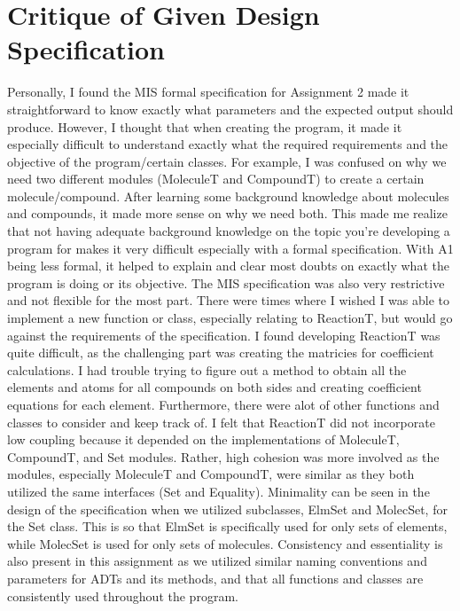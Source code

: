 \documentclass[12pt]{article}
\begin{document}
\section{Critique of Given Design Specification}
Personally, I found the MIS formal specification for Assignment 2 made it straightforward to know exactly what parameters and the expected output should produce. However, I thought that when creating the program, it made it especially difficult to understand exactly what the required requirements and the objective of the program/certain classes. For example, I was confused on why we need two different modules (MoleculeT and CompoundT) to create a certain molecule/compound. After learning some background knowledge about molecules and compounds, it made more sense on why we need both. \newline This made me realize that not having adequate background knowledge on the topic you're developing a program for makes it very difficult especially with a formal specification. With A1 being less formal, it helped to explain and clear most doubts on exactly what the program is doing or its objective. The MIS specification was also very restrictive and not flexible for the most part. There were times where I wished I was able to implement a new function or class, especially relating to ReactionT, but would go against the requirements of the specification.
\newline
I found developing ReactionT was quite difficult, as the challenging part was creating the matricies for coefficient calculations. I had trouble trying to figure out a method to obtain all the elements and atoms for all compounds on both sides and creating coefficient equations for each element. Furthermore, there were alot of other functions and classes to consider and keep track of. I felt that ReactionT did not incorporate low coupling because it depended on the implementations of MoleculeT, CompoundT, and Set modules. Rather, high cohesion was more involved as the modules, especially MoleculeT and CompoundT, were similar as they both utilized the same interfaces (Set and Equality).  Minimality can be seen in the design of the specification when we utilized subclasses, ElmSet and MolecSet, for the Set class. This is so that ElmSet is specifically used for only sets of elements, while MolecSet is used for only sets of molecules. Consistency and essentiality is also present in this assignment as we utilized similar naming conventions and parameters for ADTs and its methods, and that all functions and classes are consistently used throughout the program. 
\end{document}
